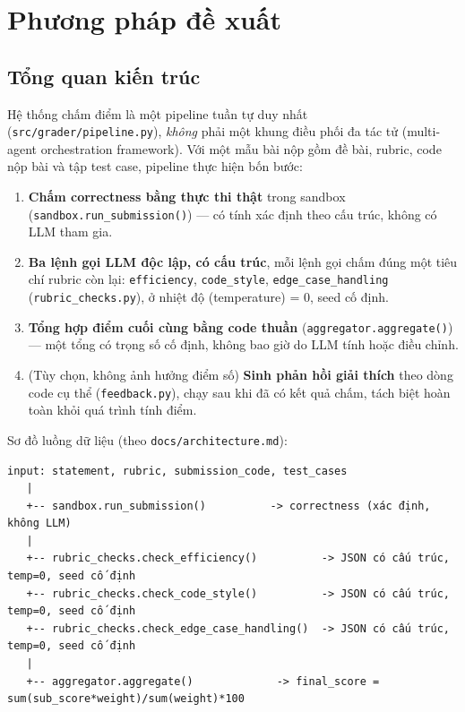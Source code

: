 \documentclass[a4paper,12pt]{report}
\begin{document}
\chapter{Phương pháp đề xuất}
\label{ch:proposed-method}

\section{Tổng quan kiến trúc}

Hệ thống chấm điểm là một pipeline tuần tự duy nhất
(\texttt{src/grader/pipeline.py}), \emph{không} phải một khung điều phối
đa tác tử (multi-agent orchestration framework). Với một mẫu bài nộp gồm đề
bài, rubric, code nộp bài và tập test case, pipeline thực hiện bốn bước:

\begin{enumerate}
  \item \textbf{Chấm correctness bằng thực thi thật} trong sandbox
    (\texttt{sandbox.run\_submission()}) — có tính xác định theo cấu
    trúc, không có LLM tham gia.
  \item \textbf{Ba lệnh gọi LLM độc lập, có cấu trúc}, mỗi lệnh gọi chấm
    đúng một tiêu chí rubric còn lại: \texttt{efficiency},
    \texttt{code\_style}, \texttt{edge\_case\_handling}
    (\texttt{rubric\_checks.py}), ở nhiệt độ (temperature) = 0, seed cố
    định.
  \item \textbf{Tổng hợp điểm cuối cùng bằng code thuần}
    (\texttt{aggregator.aggregate()}) — một tổng có trọng số cố định,
    không bao giờ do LLM tính hoặc điều chỉnh.
  \item (Tùy chọn, không ảnh hưởng điểm số) \textbf{Sinh phản hồi giải
    thích} theo dòng code cụ thể (\texttt{feedback.py}), chạy sau khi đã
    có kết quả chấm, tách biệt hoàn toàn khỏi quá trình tính điểm.
\end{enumerate}

Sơ đồ luồng dữ liệu (theo \texttt{docs/architecture.md}):

\begin{verbatim}
input: statement, rubric, submission_code, test_cases
   |
   +-- sandbox.run_submission()          -> correctness (xác định, không LLM)
   |
   +-- rubric_checks.check_efficiency()          -> JSON có cấu trúc, temp=0, seed cố định
   +-- rubric_checks.check_code_style()          -> JSON có cấu trúc, temp=0, seed cố định
   +-- rubric_checks.check_edge_case_handling()  -> JSON có cấu trúc, temp=0, seed cố định
   |
   +-- aggregator.aggregate()             -> final_score = sum(sub_score*weight)/sum(weight)*100
\end{verbatim}
\end{document}
